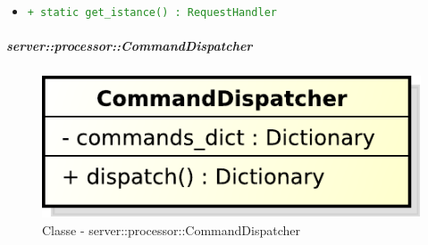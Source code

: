 \begin{itemize}
\begin{itemize}
\begin{description}
              \end{description}
             \item \textcolor{forestgreen}{\texttt{+ static get\_istance() : RequestHandler}}
          \end{itemize}
      \end{itemize}

\subparagraph{server::processor::CommandDispatcher} %
    \label{subp:bdsm_app_server_:processor_commanddispatcher}
    \begin{figure}[!htbp]
  		\centering
 		\centerline{\includegraphics[scale=0.75]{./images/server/classes/processor/command_dispatcher.pdf}}
 		\caption{Classe - server::processor::CommandDispatcher}
	\end{figure}

